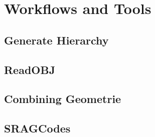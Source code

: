 
\section{Workflows and Tools}

\subsection{Generate Hierarchy}

\subsection{ReadOBJ}

\subsection{Combining Geometrie}

\subsection{SRAGCodes}
